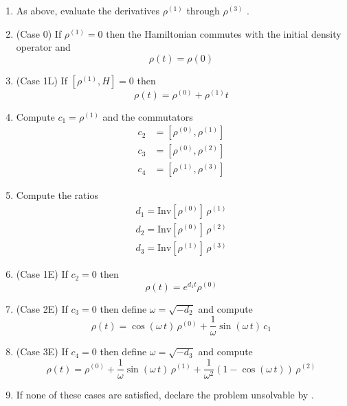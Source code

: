\begin{enumerate}

\item As above, evaluate the derivatives $\rho^{(1)}$ through $\rho^{(3)}$ .

\item (Case 0) If $\rho^{(1)} = 0$ then the Hamiltonian commutes with the initial density operator and
\begin{equation}
\rho(t) = \rho(0)
\end{equation}

\item (Case 1L) If $[\rho^{(1)}, H] = 0$ then
\begin{equation}
\rho(t) = \rho^{(0)} + \rho^{(1)} t
\end{equation}

\item Compute $c_1 =  \rho^{(1)}$ and the commutators 
\begin{subequations}
\begin{align}
c_2 &= [\rho^{(0)}, \rho^{(1)}] \\
c_3 &= [\rho^{(0)}, \rho^{(2)}] \\
c_4 &= [\rho^{(1)}, \rho^{(3)}]
\end{align}
\end{subequations}

\item Compute the ratios
\begin{subequations}
\begin{align} 
d_1 = {\mathrm{Inv}}[\rho^{(0)}] \, \rho^{(1)} \\
d_2 = {\mathrm{Inv}}[\rho^{(0)}] \, \rho^{(2)} \\
d_3 = {\mathrm{Inv}}[\rho^{(1)}] \, \rho^{(3)}
 \end{align}
\end{subequations}

\item (Case 1E) If $c_2 = 0$ then
\begin{equation}
\rho(t) = 
  e^{d_1 t} \rho^{(0)}
\end{equation}  

\item (Case 2E) If $c_3 = 0$ then define $\omega = \sqrt{-d_2}$ and compute
\begin{equation}
\rho(t) = 
  \cos{(\omega \, t)} \, \rho^{(0)}
  + \frac{1}{\omega} \sin{(\omega \, t)} \, c_1
\end{equation}

\item (Case 3E) If $c_4 = 0$ then define $\omega = \sqrt{-d_3}$ and compute
\begin{equation}
\rho(t) = 
  \rho^{(0)}
  + \frac{1}{\omega} \sin{(\omega \, t)} \, \rho^{(1)} 
  + \frac{1}{\omega^2} \left( 1 -  \cos{(\omega \, t)} \right) \, \rho^{(2)} 
\end{equation}

\item If none of these cases are satisfied, declare the problem unsolvable by .

\end{enumerate}

